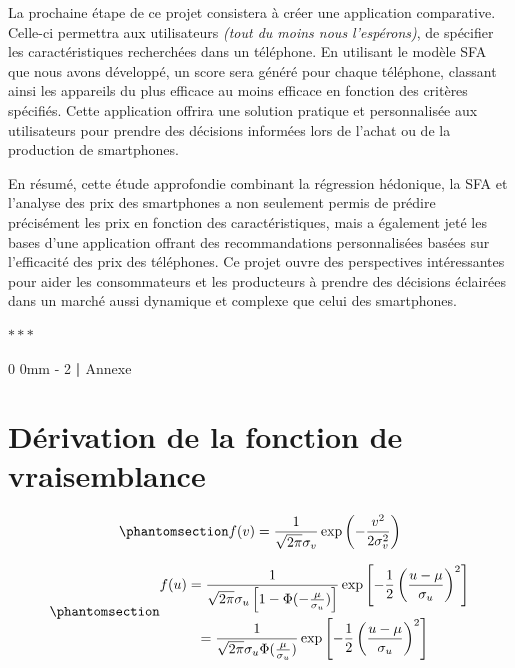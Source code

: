 \documentclass[
  12pt,
]{report}
\makeatletter
\newcommand{\macrostars}{
    \vspace{2em}
    \begin{center}
        \textcolor{highlight!80!black}{\Large{$\ast\ast\ast$}}
    \end{center}
}
\renewcommand{\chapter}{%
    \clearpage %
    \@startsection{chapter}%
    {0} %
    {0mm} %
    {-\baselineskip} %
    {2\baselineskip} %
    {\normalfont\Huge\bfseries | \Huge\bfseries}%
}
\makeatother
\begin{document}
La prochaine étape de ce projet consistera à créer une application
comparative. Celle-ci permettra aux utilisateurs \emph{(tout du moins
nous l'espérons)}, de spécifier les caractéristiques recherchées dans un
téléphone. En utilisant le modèle SFA que nous avons développé, un score
sera généré pour chaque téléphone, classant ainsi les appareils du plus
efficace au moins efficace en fonction des critères spécifiés. Cette
application offrira une solution pratique et personnalisée aux
utilisateurs pour prendre des décisions informées lors de l'achat ou de
la production de smartphones.

En résumé, cette étude approfondie combinant la régression hédonique, la
SFA et l'analyse des prix des smartphones a non seulement permis de
prédire précisément les prix en fonction des caractéristiques, mais a
également jeté les bases d'une application offrant des recommandations
personnalisées basées sur l'efficacité des prix des téléphones. Ce
projet ouvre des perspectives intéressantes pour aider les consommateurs
et les producteurs à prendre des décisions éclairées dans un marché
aussi dynamique et complexe que celui des smartphones.

\macrostars

\chapter{Annexe}\label{annexe}

\section{Dérivation de la fonction de
vraisemblance}\label{duxe9rivation-de-la-fonction-de-vraisemblance}

\begin{equation}\phantomsection\label{eq-fv}{
f(v) = \frac{1}{\sqrt{2\pi}\sigma_v}\exp{\left(-\frac{v^2}{2\sigma^2_v} \right)}
}\end{equation}

\begin{equation}\phantomsection\label{eq-fu}{
\begin{gathered}
f(u) = \frac{1}{\sqrt{2\pi}\sigma_u\left[1-\Phi(-\frac{\mu}{\sigma_u})\right]}\exp\left[-\frac{1}{2}\left(\frac{u-\mu}{\sigma_u}\right)^2 \right]\\
= \frac{1}{\sqrt{2\pi}\sigma_u\Phi(\frac{\mu}{\sigma_u})}\exp\left[-\frac{1}{2}\left(\frac{u-\mu}{\sigma_u}\right)^2 \right]
\end{gathered}
}\end{equation}
\end{document}
